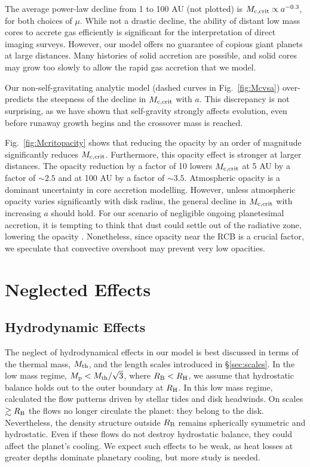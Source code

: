 \documentclass[apj, numberedappendix]{emulateapj}
\newcommand{\Fig}[1]{Fig.~\ref{#1}}
\newcommand{\RB}{R_{\rm B}}
\newcommand{\RH}{R_{\rm H}}
\newcommand{\pla}{_{\rm p}}
\def\crit{_{\rm{c, crit}}}
\begin{document}
The average power-law decline from 1 to 100 AU (not plotted) is $M\crit \propto a^{-0.3}$, for both choices of $\mu$.   While not a drastic decline, the ability of distant low mass cores to accrete gas efficiently is significant for the interpretation of direct imaging surveys.  However, our model offers no guarantee of copious giant planets at large distances.  Many histories of solid accretion are possible, and solid cores may grow too slowly to allow the rapid gas accretion that we model.  

Our non-self-gravitating analytic model (dashed curves in \Fig{fig:Mcvsa}) over-predicts the steepness of the decline in $M\crit$ with $a$.  This discrepancy is not surprising, as we have shown that self-gravity strongly affects evolution, even before runaway growth begins and the crossover mass is reached.

\Fig{fig:Mcritopacity} shows that reducing the opacity by an order of magnitude significantly reduces $M\crit$.  Furthermore, this opacity effect is stronger at larger distances.  The opacity reduction by a factor of 10 lowers $M\crit$ at 5 AU by a factor of $\sim$$2.5$ and at 100 AU by a factor of $\sim$$3.5$.  Atmospheric opacity is a dominant uncertainty in core accretion modelling.  However, unless atmospheric opacity varies significantly with disk radius, the general decline in $M\crit$ with increasing $a$ should hold.  For our scenario of negligible ongoing planetesimal accretion, it is tempting to think that dust could settle out of the radiative zone, lowering the opacity \citep{podolak03}.  Nonetheless, since opacity near the RCB is a crucial factor, we speculate that convective overshoot may prevent very low opacities.

\section{Neglected Effects}\label{sec:neglected}

\subsection{Hydrodynamic Effects}\label{sec:hydro}
The neglect of hydrodynamical effects in our model is best discussed in terms of the thermal mass, $M_{\rm th}$, and the length scales introduced in \S\ref{sec:scales}.  In the low mass regime, $M\pla < M_{\rm th}/ \sqrt{3}$, where $\RB < \RH$, we assume that hydrostatic balance holds out to the outer boundary at $\RH$.   In this low mass regime, \citet[]{Orm13} calculated the flow patterns driven by stellar tides and disk headwinds.     On scales $\gtrsim \RB$ the flows no longer circulate the planet: they belong to the disk.  Nevertheless, the density structure outside $\RB$ remains spherically symmetric and hydrostatic.  Even if these flows do not destroy hydrostatic balance, they could affect the planet's cooling.  We expect such effects to be weak, as heat losses at greater depths dominate planetary cooling, but more study is needed.
\end{document}
